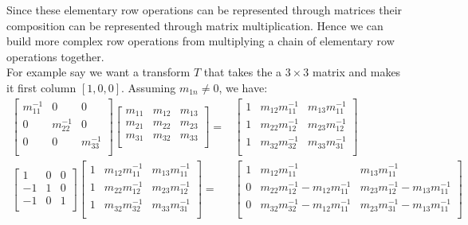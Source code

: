 Since these elementary row operations can be represented through matrices their composition can be represented through matrix multiplication.
Hence we can build more complex row operations from multiplying a chain of elementary row operations together.
\\

For example say we want a transform $T$ that takes the a $3\times 3$ matrix and makes it first column $[1,0,0]$.
Assuming $m_{1n} \neq 0$, we have:
\begin{equation*}
\begin{aligned}
\begin{bmatrix}
	m_{11}^{-1}&0&0 \\
	0&m_{22}^{-1}&0 \\
	0&0&m_{33}^{-1} \\
\end{bmatrix}
\begin{bmatrix}
	m_{11} & m_{12} & m_{13} \\
	m_{21} & m_{22} & m_{23} \\
	m_{31} & m_{32} & m_{33} \\
\end{bmatrix}
=&
\begin{bmatrix}
	1 & m_{12}m_{11}^{-1} & m_{13}m_{11}^{-1} \\
	1 & m_{22}m_{12}^{-1} & m_{23}m_{12}^{-1} \\
	1 & m_{32} m_{32}^{-1}& m_{33} m_{31}^{-1} \\
\end{bmatrix} \\
\begin{bmatrix}
	1&0&0 \\
	-1&1&0 \\
	-1&0&1 \\
\end{bmatrix}
\begin{bmatrix}
	1 & m_{12}m_{11}^{-1} & m_{13}m_{11}^{-1} \\
	1 & m_{22}m_{12}^{-1} & m_{23}m_{12}^{-1} \\
	1 & m_{32} m_{32}^{-1}& m_{33} m_{31}^{-1} \\
\end{bmatrix} 
=&
\begin{bmatrix}
	1 & m_{12}m_{11}^{-1} & m_{13}m_{11}^{-1} \\
	0 & m_{22}m_{12}^{-1}-m_{12}m_{11}^{-1} & m_{23}m_{12}^{-1} -m_{13}m_{11}^{-1}\\
	0 & m_{32} m_{32}^{-1}-m_{12}m_{11}^{-1}& m_{23} m_{31}^{-1} -m_{13}m_{11}^{-1}\\
\end{bmatrix} \\
\end{aligned}
\end{equation*}

